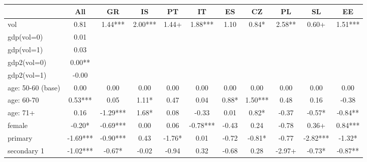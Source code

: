 {
\def\sym#1{\ifmmode^{#1}\else\(^{#1}\)\fi}
\begin{tabular}{l*{10}{c}}
\hline\hline
            &\multicolumn{1}{c}{All}&\multicolumn{1}{c}{GR}&\multicolumn{1}{c}{IS}&\multicolumn{1}{c}{PT}&\multicolumn{1}{c}{IT}&\multicolumn{1}{c}{ES}&\multicolumn{1}{c}{CZ}&\multicolumn{1}{c}{PL}&\multicolumn{1}{c}{SL}&\multicolumn{1}{c}{EE}\\
\hline
vol         &        0.81   &        1.44***&        2.00***&        1.44+  &        1.88***&        1.10   &        0.84*  &        2.58** &        0.60+  &        1.51***\\
gdp(vol=0)  &        0.01   &               &               &               &               &               &               &               &               &               \\
gdp(vol=1)  &        0.03   &               &               &               &               &               &               &               &               &               \\
gdp2(vol=0) &        0.00** &               &               &               &               &               &               &               &               &               \\
gdp2(vol=1) &       -0.00   &               &               &               &               &               &               &               &               &               \\
age: 50-60 (base)&        0.00   &        0.00   &        0.00   &        0.00   &        0.00   &        0.00   &        0.00   &        0.00   &        0.00   &        0.00   \\
age: 60-70  &        0.53***&        0.05   &        1.11*  &        0.47   &        0.04   &        0.88*  &        1.50***&        0.48   &        0.16   &       -0.38   \\
age: 71+    &        0.16   &       -1.29***&        1.68*  &        0.08   &       -0.33   &        0.01   &        0.82*  &       -0.37   &       -0.57*  &       -0.84** \\
female      &       -0.20*  &       -0.69***&        0.00   &        0.06   &       -0.78***&       -0.43   &        0.24   &       -0.78   &        0.36+  &        0.84***\\
primary     &       -1.69***&       -0.90***&        0.43   &       -1.76*  &        0.01   &       -0.72   &       -0.81*  &       -0.77   &       -2.82***&       -1.32*  \\
secondary 1 &       -1.02***&       -0.67*  &       -0.02   &       -0.94   &        0.32   &       -0.68   &        0.28   &       -2.97+  &       -0.73*  &       -0.87** \\

\end{tabular}}

